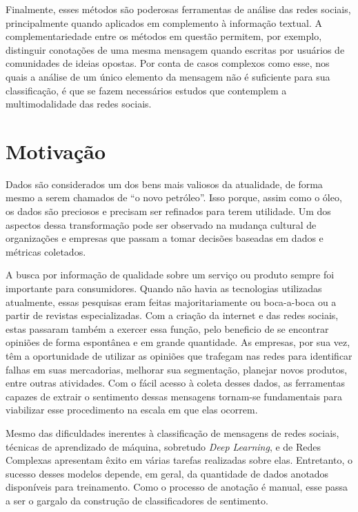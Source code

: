 Finalmente, esses métodos são poderosas ferramentas de análise das redes sociais,
principalmente quando aplicados em complemento à informação textual.
A complementariedade entre os métodos em questão permitem, por exemplo, distinguir
conotações de uma mesma mensagem quando escritas por usuários de comunidades de
ideias opostas.
Por conta de casos complexos como esse, nos quais a análise de um único elemento
da mensagem não é suficiente para sua classificação, é que se fazem necessários
estudos que contemplem a multimodalidade das redes sociais.

\section{Motivação}

Dados são considerados um dos bens mais valiosos da atualidade, de forma mesmo a
serem chamados de ``o novo petróleo''.
Isso porque, assim como o óleo, os dados são preciosos e precisam ser refinados
para terem utilidade.
Um dos aspectos dessa transformação pode ser observado na mudança cultural de
organizações e empresas que passam a tomar decisões baseadas em dados e métricas
coletados.

A busca por informação de qualidade sobre um serviço ou produto sempre foi
importante para consumidores.
Quando não havia as tecnologias utilizadas atualmente, essas pesquisas eram feitas
majoritariamente ou boca-a-boca ou a partir de revistas especializadas.
Com a criação da internet e das redes sociais, estas passaram também a exercer
essa função, pelo beneficio de se encontrar opiniões de forma espontânea e em
grande quantidade.
As empresas, por sua vez, têm a oportunidade de utilizar as opiniões que
trafegam nas redes para identificar falhas em suas mercadorias, melhorar sua
segmentação, planejar novos produtos, entre outras atividades.
Com o fácil acesso à coleta desses dados, as ferramentas capazes de extrair o
sentimento dessas mensagens tornam-se fundamentais para viabilizar esse
procedimento na escala em que elas ocorrem.

Mesmo das dificuldades inerentes à classificação de mensagens de redes sociais,
técnicas de aprendizado de máquina, sobretudo \textit{Deep Learning}, e de Redes
Complexas apresentam êxito em várias tarefas realizadas sobre elas.
Entretanto, o sucesso desses modelos depende, em geral, da quantidade de dados
anotados disponíveis para treinamento.
Como o processo de anotação é manual, esse passa a ser o gargalo da construção de
classificadores de sentimento.


